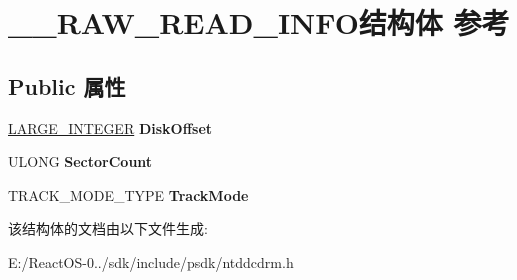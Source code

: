 \hypertarget{struct_____r_a_w___r_e_a_d___i_n_f_o}{}\section{\+\_\+\+\_\+\+R\+A\+W\+\_\+\+R\+E\+A\+D\+\_\+\+I\+N\+F\+O结构体 参考}
\label{struct_____r_a_w___r_e_a_d___i_n_f_o}
\subsection*{Public 属性}
\begin{DoxyCompactItemize}
\item 
\mbox{\label{struct_____r_a_w___r_e_a_d___i_n_f_o_ad29879f15a193757f657d1364b7c3549}} 
\hyperlink{union___l_a_r_g_e___i_n_t_e_g_e_r}{L\+A\+R\+G\+E\+\_\+\+I\+N\+T\+E\+G\+ER} {\bfseries Disk\+Offset}
\item 
\mbox{\label{struct_____r_a_w___r_e_a_d___i_n_f_o_ac132875424cf018603a7454472fb26e7}} 
U\+L\+O\+NG {\bfseries Sector\+Count}
\item 
\mbox{\label{struct_____r_a_w___r_e_a_d___i_n_f_o_a5832ff87253c51c7d4d75e05f5715c8f}} 
T\+R\+A\+C\+K\+\_\+\+M\+O\+D\+E\+\_\+\+T\+Y\+PE {\bfseries Track\+Mode}
\end{DoxyCompactItemize}


该结构体的文档由以下文件生成\+:\begin{DoxyCompactItemize}
\item 
E\+:/\+React\+O\+S-\/0../sdk/include/psdk/ntddcdrm.\+h\end{DoxyCompactItemize}
